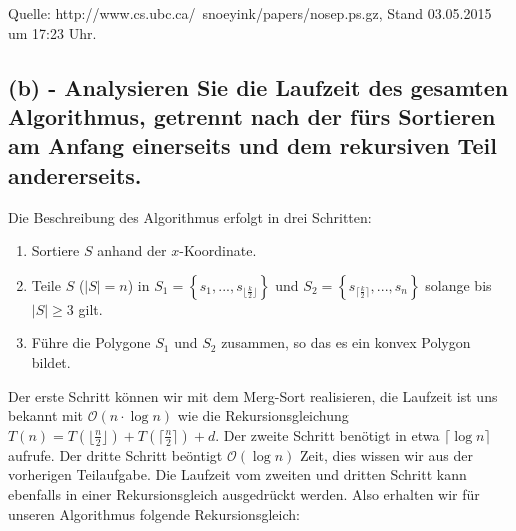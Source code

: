 \documentclass[a4paper]{article}
\begin{document}
Quelle: http://www.cs.ubc.ca/~snoeyink/papers/nosep.ps.gz, Stand 03.05.2015 um 17:23 Uhr. 

\subsection*{(b) - Analysieren Sie die Laufzeit des gesamten Algorithmus, getrennt nach der fürs Sortieren am Anfang einerseits und dem rekursiven Teil andererseits. }

Die Beschreibung des Algorithmus erfolgt in drei Schritten:

\begin{enumerate}

\item Sortiere $S$ anhand der $x$-Koordinate.

\item Teile $S$ ($|S| = n$) in $S_1 = \left\{s_1, ..., s_{\lfloor \frac{k}{2} \rfloor } \right\}$ und $S_2 = \left\{s_{ \lceil \frac{k}{2} \rceil}, ..., s_n \right\}$ solange bis $|S| \geq 3$ gilt.

\item Führe die Polygone $S_1$ und $S_2$ zusammen, so das es ein konvex Polygon bildet.

\end{enumerate}

Der erste Schritt können wir mit dem Merg-Sort realisieren, die Laufzeit ist uns bekannt mit $\mathcal{O}(n \cdot \log n)$ wie die Rekursionsgleichung $T(n) = T(\lfloor \frac{n}{2} \rfloor) + T(\lceil \frac{n}{2} \rceil) + d$.
Der zweite Schritt benötigt in etwa $\lceil \log n \rceil$ aufrufe. Der dritte Schritt beöntigt $\mathcal{O}(\log n)$ Zeit, dies wissen wir aus der vorherigen Teilaufgabe. Die Laufzeit vom zweiten und dritten Schritt kann ebenfalls in einer Rekursionsgleich ausgedrückt werden. Also erhalten wir für unseren Algorithmus folgende Rekursionsgleich:
\end{document}
